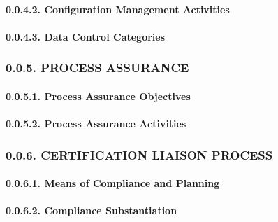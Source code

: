 \documentclass[
]{article}
\begin{document}
\hypertarget{configuration-management-activities}{%
\paragraph{0.0.4.2. Configuration Management
Activities}\label{configuration-management-activities}}

\hypertarget{data-control-categories}{%
\paragraph{0.0.4.3. Data Control
Categories}\label{data-control-categories}}

\hypertarget{process-assurance}{%
\subsubsection{0.0.5. PROCESS ASSURANCE}\label{process-assurance}}

\hypertarget{process-assurance-objectives}{%
\paragraph{0.0.5.1. Process Assurance
Objectives}\label{process-assurance-objectives}}

\hypertarget{process-assurance-activities}{%
\paragraph{0.0.5.2. Process Assurance
Activities}\label{process-assurance-activities}}

\hypertarget{certification-liaison-process}{%
\subsubsection{0.0.6. CERTIFICATION LIAISON
PROCESS}\label{certification-liaison-process}}

\hypertarget{means-of-compliance-and-planning}{%
\paragraph{0.0.6.1. Means of Compliance and
Planning}\label{means-of-compliance-and-planning}}

\hypertarget{compliance-substantiation}{%
\paragraph{0.0.6.2. Compliance
Substantiation}\label{compliance-substantiation}}
\end{document}
